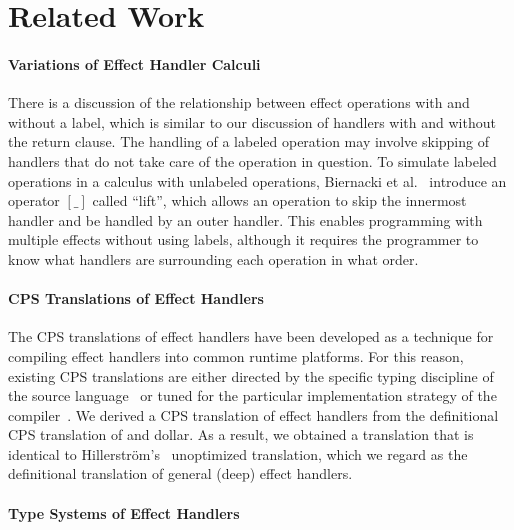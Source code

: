 \section{Related Work}
\label{sec:related}

\paragraph{Variations of Effect Handler Calculi}

There is a discussion of the relationship between effect operations with and
without a label, which is similar to our discussion of handlers with and
without the return clause.
The handling of a labeled operation may involve skipping of handlers that
do not take care of the operation in question.
To simulate labeled operations in a calculus with unlabeled operations,
Biernacki et al.~\cite{biernacki-care} introduce an operator $[\_]$
called ``lift'', which allows an operation to skip the innermost handler
and be handled by an outer handler.
This enables programming with multiple effects without using labels,
although it requires the programmer to know what handlers are surrounding
each operation in what order.


\paragraph{CPS Translations of Effect Handlers}

The CPS translations of effect handlers have been developed as a technique
for compiling effect handlers into common runtime platforms.
For this reason, existing CPS translations are either directed by the
specific typing discipline of the source
language~\cite{leijen-cps,brachthauser-mass} or tuned for the particular
implementation strategy of the compiler~\cite{hillerstrom-cps,hillerstrom-jfp}.
We derived a CPS translation of effect handlers from the definitional CPS
translation of \shiftztt and dollar.
As a result, we obtained a translation that is identical to
Hillerstr\"om's~\cite{hillerstrom-cps} unoptimized translation, which we
regard as the definitional translation of general (deep) effect handlers.


\paragraph{Type Systems of Effect Handlers}

